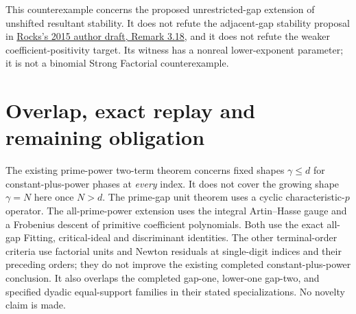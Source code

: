 \documentclass[11pt]{article}
\begin{document}
This counterexample concerns the proposed unrestricted-gap
extension of unshifted resultant stability. It does not refute
the adjacent-gap stability proposal in
\href{sources/rocks-2015-author-preprint.pdf}
{Rocks's 2015 author draft, Remark 3.18}, and it does not refute
the weaker coefficient-positivity target.
Its witness has a nonreal lower-exponent parameter; it is not a
binomial Strong Factorial counterexample.

\section{Overlap, exact replay and remaining obligation}
The existing prime-power two-term theorem concerns fixed shapes
$\gamma\le d$ for constant-plus-power phases at \emph{every} index.
It does not cover the growing shape $\gamma=N$ here once $N>d$.
The prime-gap unit theorem uses a cyclic characteristic-$p$ operator.
The all-prime-power extension uses the integral Artin--Hasse gauge
and a Frobenius descent of primitive coefficient polynomials. Both
use the exact all-gap Fitting, critical-ideal and discriminant identities. The other
terminal-order criteria use factorial units and Newton residuals at
single-digit indices and their preceding orders; they do not improve
the existing completed constant-plus-power conclusion. It also overlaps the completed
gap-one, lower-one gap-two, and specified dyadic equal-support
families in their stated specializations. No novelty claim is made.
\end{document}
